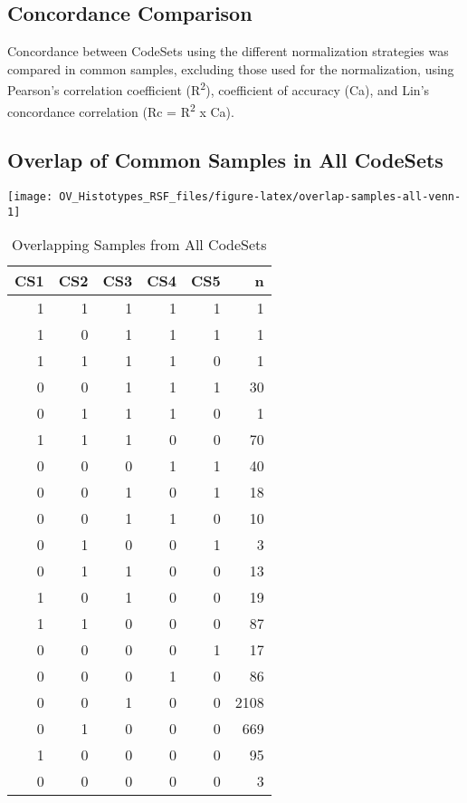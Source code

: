 \documentclass[
]{report}
\begin{document}
\hypertarget{concordance-comparison}{%
\subsection{Concordance Comparison}\label{concordance-comparison}}

Concordance between CodeSets using the different normalization strategies was compared in common samples, excluding those used for the normalization, using Pearson's correlation coefficient (R\textsuperscript{2}), coefficient of accuracy (Ca), and Lin's concordance correlation (Rc = R\textsuperscript{2} x Ca).

\hypertarget{overlap-of-common-samples-in-all-codesets}{%
\subsection{Overlap of Common Samples in All CodeSets}\label{overlap-of-common-samples-in-all-codesets}}

\begin{center}\texttt{[image: OV\_Histotypes\_RSF\_files/figure-latex/overlap-samples-all-venn-1]} \end{center}

\begin{table}

\caption{\label{tab:overlap-samples-all-table}Overlapping Samples from All CodeSets}
\centering
\begin{tabular}[t]{r|r|r|r|r|r}
\hline
CS1 & CS2 & CS3 & CS4 & CS5 & n\\
\hline
1 & 1 & 1 & 1 & 1 & 1\\
\hline
1 & 0 & 1 & 1 & 1 & 1\\
\hline
1 & 1 & 1 & 1 & 0 & 1\\
\hline
0 & 0 & 1 & 1 & 1 & 30\\
\hline
0 & 1 & 1 & 1 & 0 & 1\\
\hline
1 & 1 & 1 & 0 & 0 & 70\\
\hline
0 & 0 & 0 & 1 & 1 & 40\\
\hline
0 & 0 & 1 & 0 & 1 & 18\\
\hline
0 & 0 & 1 & 1 & 0 & 10\\
\hline
0 & 1 & 0 & 0 & 1 & 3\\
\hline
0 & 1 & 1 & 0 & 0 & 13\\
\hline
1 & 0 & 1 & 0 & 0 & 19\\
\hline
1 & 1 & 0 & 0 & 0 & 87\\
\hline
0 & 0 & 0 & 0 & 1 & 17\\
\hline
0 & 0 & 0 & 1 & 0 & 86\\
\hline
0 & 0 & 1 & 0 & 0 & 2108\\
\hline
0 & 1 & 0 & 0 & 0 & 669\\
\hline
1 & 0 & 0 & 0 & 0 & 95\\
\hline
0 & 0 & 0 & 0 & 0 & 3\\
\hline
\end{tabular}
\end{table}
\end{document}
